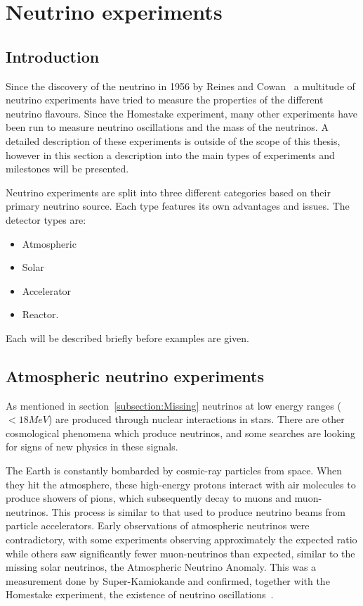 \chapter{Neutrino  experiments}
\label{c:expIntro}

\section{Introduction}
Since the discovery of the neutrino in 1956 by Reines and Cowan~\cite{6Reines} a multitude of neutrino experiments have tried to measure the properties of the different neutrino flavours. Since the Homestake experiment, many other experiments have been run to measure neutrino oscillations and the mass of the neutrinos. A detailed description of these experiments is outside of the scope of this thesis, however in this section a description into the main types of experiments and milestones will be presented.

Neutrino experiments are split into three different categories based on their primary neutrino source. Each type features its own advantages and issues.
The detector types are:
\begin{itemize}
\item Atmospheric
\item Solar
\item Accelerator
\item Reactor.
\end{itemize}
Each will be described briefly before examples are given.

\pagebreak
\newpage
\section{Atmospheric neutrino experiments}

As mentioned in section~\ref{subsection:Missing} neutrinos at low energy ranges ($<18 MeV$) are produced through nuclear interactions in stars. There are other cosmological phenomena which produce neutrinos, and some searches are looking for signs of new physics in these signals. 

The Earth is constantly bombarded by cosmic-ray particles from space. When they hit the atmosphere, these high-energy protons interact with air molecules to produce showers of pions, which subsequently decay to muons and muon-neutrinos. This process is similar to that used to produce neutrino beams from particle accelerators. Early observations of atmospheric neutrinos were contradictory, with some experiments observing approximately the expected ratio while others saw significantly fewer muon-neutrinos than expected, similar to the missing solar neutrinos, the Atmospheric Neutrino Anomaly. This was a measurement done by Super-Kamiokande and confirmed, together with the Homestake experiment, the existence of neutrino oscillations~\cite{10Fukuda, 9Davis}.

